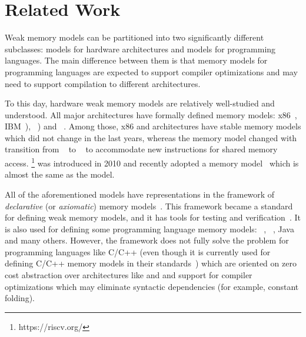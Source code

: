 \section{Related Work}
\label{sec:related}
Weak memory models can be partitioned into two significantly different subclasses:
models for hardware architectures and models for programming languages.
The main difference between them is that memory models for programming languages
are expected to support compiler optimizations and may need to support compilation
to different architectures.

To this day, hardware weak memory models are relatively well-studied and understood.
All major architectures have formally defined memory models:
x86~\cite{Sewell-al:CACM10},
IBM~\POWER \cite{Alglave-DAMP09,Sarkar-al:PLDI11,Alglave-al:TOPLAS14}),
\ARM~\cite{Chong-ASPLOS08, Alglave-DAMP09,Pulte-al:POPL18,Flur-al:POPL16,Alglave-al:TOPLAS14})
and \RISC~\cite{Pulte-al:POPL18}.
Among those, x86 and \POWER architectures have stable memory models which did not change in the last years,
whereas the \ARM memory model changed with transition from ~\cite{Alglave-al:TOPLAS14} to ~\cite{Pulte-al:POPL18}
to accommodate new instructions for shared memory access.
\RISC\footnote{https://riscv.org/} was introduced in 2010 and recently adopted a memory model~\cite{Pulte-al:POPL18}
which is almost the same as the  model.

All of the aforementioned models have representations in the framework of 
\emph{declarative} (or \emph{axiomatic})
memory models~\cite{Alglave-al:TOPLAS14}.
This framework became a standard for defining weak memory models,
and it has tools for testing and verification~\cite{Alglave-al:TOPLAS14}.
It is also used for defining some programming language memory models: 
\CPP~\cite{Batty-al:POPL11}, \JS~\cite{Watt-al:PLDI2020}, Java~\cite{Manson-al:POPL05} and many others.
However, the framework does not fully solve the problem for programming languages like C/C++
(even though it is currently used for defining C/C++ memory models in their standards~\cite{Batty-al:POPL11})
which are oriented on zero cost abstraction over architectures like \ARM and \POWER and support for compiler
optimizations which may eliminate syntactic dependencies (for example, constant folding).

